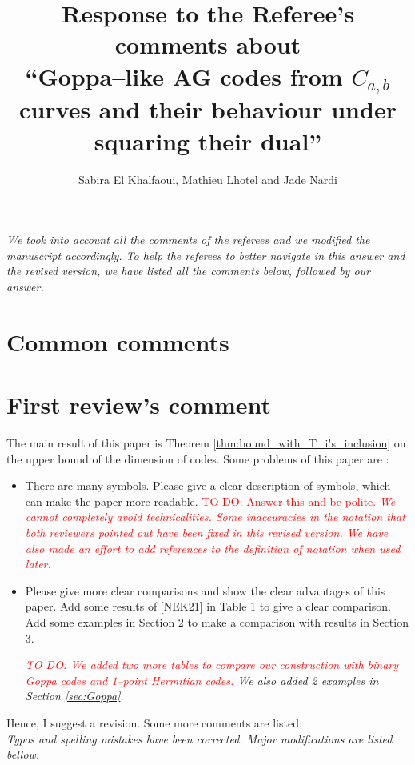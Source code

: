 \documentclass[12pt,a4paper]{amsart}
\title[Goppa--like AG codes from $C_{a,b}$ curves and their behaviour under squaring their dual]{Response to the Referee's comments about  \\ ``Goppa--like AG codes from $C_{a,b}$ curves and their behaviour under squaring their dual''}
\author{Sabira El Khalfaoui, Mathieu Lhotel and Jade Nardi}
\newcommand\TODO[1]{\textcolor{red}{TO DO: #1}}
\begin{document}
\maketitle

\textit{We took into account all the comments of the referees and we modified the manuscript accordingly. To help the referees to better navigate in this answer and the revised version, we have listed all the comments below, followed by our answer.} 

\section*{Common comments}
 
\section*{First review's comment}

The main result of this paper is Theorem \ref{thm:bound_with_T_i's_inclusion} on the upper bound of the dimension of codes. Some problems
of this paper are :
\begin{itemize}
\item  There are many symbols. Please give a clear description of symbols, which can make the paper more readable. \TODO{Answer this and be polite.
\textit{We cannot completely avoid technicalities. Some inaccuracies in the notation that both reviewers pointed out have been fixed in this revised version. We have also made an effort to add references to the definition of notation when used later.}}


\item  Please give more clear comparisons and show the clear advantages of this paper. Add some results of [NEK21] in Table 1 to give a clear comparison. Add some examples in Section 2 to make a comparison with results in Section 3. 

\textit{\TODO{We added two more tables to compare our construction with binary Goppa codes and 1--point Hermitian codes.} We also added 2 examples in Section \ref{sec:Goppa}.}

\end{itemize}

Hence, I suggest a revision. Some more comments are listed: \\

\textit{Typos and spelling mistakes have been corrected. Major modifications are listed bellow.} \\
\end{document}

